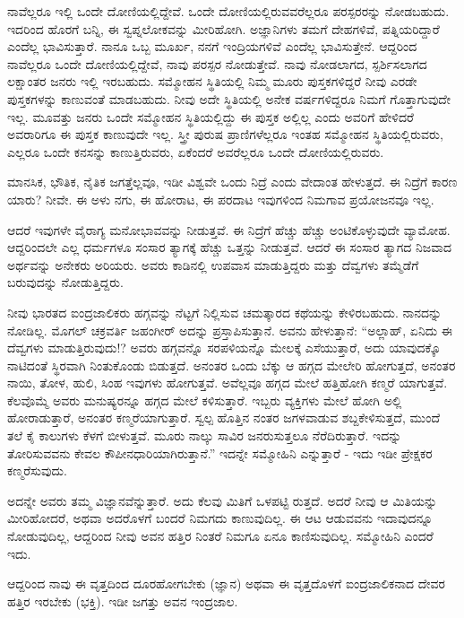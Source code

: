 ನಾವೆಲ್ಲರೂ ಇಲ್ಲಿ ಒಂದೇ ದೋಣಿಯಲ್ಲಿದ್ದೇವೆ. ಒಂದೇ ದೋಣಿಯಲ್ಲಿರುವವರೆಲ್ಲರೂ ಪರಸ್ಪರರನ್ನು ನೋಡಬಹುದು. ಇದರಿಂದ ಹೊರಗೆ ಬನ್ನಿ, ಈ ಸ್ವಪ್ನಲೋಕವನ್ನು ಮೀರಿಹೋಗಿ. ಅಜ್ಞಾನಿಗಳು ತಮಗೆ ದೇಹಗಳಿವೆ, ಪತ್ನಿಯರಿದ್ದಾರೆ ಎಂದೆಲ್ಲ ಭಾವಿಸುತ್ತಾರೆ. ನಾನೂ ಒಬ್ಬ ಮೂರ್ಖ, ನನಗೆ ಇಂದ್ರಿಯಗಳಿವೆ ಎಂದೆಲ್ಲ ಭಾವಿಸುತ್ತೇನೆ. ಆದ್ದರಿಂದ ನಾವೆಲ್ಲರೂ ಒಂದೇ ದೋಣಿಯಲ್ಲಿದ್ದೇವೆ, ನಾವು ಪರಸ್ಪರ ನೋಡುತ್ತೇವೆ. ನಾವು ನೋಡಲಾಗದ, ಸ್ಪರ್ಶಿಸಲಾಗದ ಲಕ್ಷಾಂತರ ಜನರು ಇಲ್ಲಿ ಇರಬಹುದು. ಸಮ್ಮೋಹನ ಸ್ಥಿತಿಯಲ್ಲಿ ನಿಮ್ಮ ಮೂರು ಪುಸ್ತಕಗಳಿದ್ದರೆ ನೀವು ಎರಡೇ ಪುಸ್ತಕಗಳನ್ನು ಕಾಣುವಂತೆ ಮಾಡಬಹುದು. ನೀವು ಅದೇ ಸ್ಥಿತಿಯಲ್ಲಿ ಅನೇಕ ವರ್ಷಗಳಿದ್ದರೂ ನಿಮಗೆ ಗೊತ್ತಾಗುವುದೇ ಇಲ್ಲ. ಮೂವತ್ತು ಜನರು ಒಂದೇ ಸಮ್ಮೋಹನ ಸ್ಥಿತಿಯಲ್ಲಿದ್ದು ಈ ಪುಸ್ತಕ ಅಲ್ಲಿಲ್ಲ ಎಂದು ಅವರಿಗೆ ಹೇಳಿದರೆ ಅವರಾರಿಗೂ ಈ ಪುಸ್ತಕ ಕಾಣುವುದೇ ಇಲ್ಲ. ಸ್ತ್ರೀ ಪುರುಷ ಪ್ರಾಣಿಗಳೆಲ್ಲರೂ ಇಂತಹ ಸಮ್ಮೋಹನ ಸ್ಥಿತಿಯಲ್ಲಿರುವರು, ಎಲ್ಲರೂ ಒಂದೇ ಕನಸನ್ನು ಕಾಣುತ್ತಿರುವರು, ಏಕೆಂದರೆ ಅವರೆಲ್ಲರೂ ಒಂದೇ ದೋಣಿಯಲ್ಲಿರುವರು.

ಮಾನಸಿಕ, ಭೌತಿಕ, ನೈತಿಕ ಜಗತ್ತೆಲ್ಲವೂ, ಇಡೀ ವಿಶ್ವವೇ ಒಂದು ನಿದ್ರೆ ಎಂದು ವೇದಾಂತ ಹೇಳುತ್ತದೆ. ಈ ನಿದ್ರೆಗೆ ಕಾರಣ ಯಾರು? ನೀವೇ. ಈ ಅಳು ನಗು, ಈ ಹೋರಾಟ, ಈ ಪರದಾಟ ಇವುಗಳಿಂದ ನಿಮಗಾವ ಪ್ರಯೋಜನವೂ ಇಲ್ಲ.

ಆದರೆ ಇವುಗಳೇ ವೈರಾಗ್ಯ ಮನೋಭಾವವನ್ನು ನೀಡುತ್ತವೆ. ಈ ನಿದ್ರೆಗೆ ಹೆಚ್ಚು ಹೆಚ್ಚು ಅಂಟಿಕೊಳ್ಳುವುದೇ ವ್ಯಾಮೋಹ. ಆದ್ದರಿಂದಲೇ ಎಲ್ಲ ಧರ್ಮಗಳೂ ಸಂಸಾರ ತ್ಯಾಗಕ್ಕೆ ಹೆಚ್ಚು ಒತ್ತನ್ನು ನೀಡುತ್ತವೆ. ಆದರೆ ಈ ಸಂಸಾರ ತ್ಯಾಗದ ನಿಜವಾದ ಅರ್ಥವನ್ನು ಅನೇಕರು ಅರಿಯರು. ಅವರು ಕಾಡಿನಲ್ಲಿ ಉಪವಾಸ ಮಾಡುತ್ತಿದ್ದರು ಮತ್ತು ದೆವ್ವಗಳು ತಮ್ಮೆಡೆಗೆ ಬರುವುದನ್ನು ನೋಡುತ್ತಿದ್ದರು.

ನೀವು ಭಾರತದ ಐಂದ್ರಜಾಲಿಕರು ಹಗ್ಗವನ್ನು ನೆಟ್ಟಗೆ ನಿಲ್ಲಿಸುವ ಚಮತ್ಕಾರದ ಕಥೆಯನ್ನು ಕೇಳಿರಬಹುದು. ನಾನದನ್ನು ನೋಡಿಲ್ಲ. ಮೊಗಲ್ ಚಕ್ರವರ್ತಿ ಜಹಂಗೀರ್ ಅದನ್ನು ಪ್ರಸ್ತಾಪಿಸುತ್ತಾನೆ. ಅವನು ಹೇಳುತ್ತಾನೆ: “ಅಲ್ಲಾಹ್, ಏನಿದು ಈ ದೆವ್ವಗಳು ಮಾಡುತ್ತಿರುವುದು!? ಅವರು ಹಗ್ಗವನ್ನೊ ಸರಪಳಿಯನ್ನೊ ಮೇಲಕ್ಕೆ ಎಸೆಯುತ್ತಾರೆ, ಅದು ಯಾವುದಕ್ಕೊ ನಾಟಿದಂತೆ ಸ್ಥಿರವಾಗಿ ನಿಂತುಕೊಂಡು ಬಿಡುತ್ತದೆ. ಅನಂತರ ಒಂದು ಬೆಕ್ಕು ಆ ಹಗ್ಗದ ಮೇಲೇರಿ ಹೋಗುತ್ತದೆ, ಅನಂತರ ನಾಯಿ, ತೋಳ, ಹುಲಿ, ಸಿಂಹ ಇವುಗಳು ಹೋಗುತ್ತವೆ. ಅವೆಲ್ಲವೂ ಹಗ್ಗದ ಮೇಲೆ ಹತ್ತಿಹೋಗಿ ಕಣ್ಮರೆ ಯಾಗುತ್ತವೆ. ಕೆಲವೊಮ್ಮೆ ಅವರು ಮನುಷ್ಯರನ್ನೂ ಹಗ್ಗದ ಮೇಲೆ ಕಳಿಸುತ್ತಾರೆ. ಇಬ್ಬರು ವ್ಯಕ್ತಿಗಳು ಮೇಲೆ ಹೋಗಿ ಅಲ್ಲಿ ಹೋರಾಡುತ್ತಾರೆ, ಅನಂತರ ಕಣ್ಮರೆಯಾಗುತ್ತಾರೆ. ಸ್ವಲ್ಪ ಹೊತ್ತಿನ ನಂತರ ಜಗಳವಾಡುವ ಶಬ್ದಕೇಳಿಸುತ್ತದೆ, ಮುಂದೆ ತಲೆ ಕೈ ಕಾಲುಗಳು ಕೆಳಗೆ ಬೀಳುತ್ತವೆ. ಮೂರು ನಾಲ್ಕು ಸಾವಿರ ಜನರುಸುತ್ತಲೂ ನೆರೆದಿರುತ್ತಾರೆ. ಇದನ್ನು ತೋರಿಸುವವನು ಕೇವಲ ಕೌಪೀನಧಾರಿಯಾಗಿರುತ್ತಾನೆ.” ಇದನ್ನೇ ಸಮ್ಮೋಹಿನಿ ಎನ್ನುತ್ತಾರೆ - ಇದು ಇಡೀ ಪ್ರೇಕ್ಷಕರ ಕಣ್ಮರೆಸುವುದು.

ಅದನ್ನೇ ಅವರು ತಮ್ಮ ವಿಜ್ಞಾನವೆನ್ನುತ್ತಾರೆ. ಅದು ಕೆಲವು ಮಿತಿಗೆ ಒಳಪಟ್ಟಿ ರುತ್ತದೆ. ಅದರೆ ನೀವು ಆ ಮಿತಿಯನ್ನು ಮೀರಿಹೋದರೆ, ಅಥವಾ ಅದರೊಳಗೆ ಬಂದರೆ ನಿಮಗದು ಕಾಣುವುದಿಲ್ಲ. ಈ ಆಟ ಆಡುವವನು ಇದಾವುದನ್ನೂ ನೋಡುವುದಿಲ್ಲ, ಆದ್ದರಿಂದ ನೀವು ಅವನ ಹತ್ತಿರ ನಿಂತರೆ ನಿಮಗೂ ಏನೂ ಕಾಣಿಸುವುದಿಲ್ಲ. ಸಮ್ಮೋಹಿನಿ ಎಂದರೆ ಇದು.

ಆದ್ದರಿಂದ ನಾವು ಈ ವೃತ್ತದಿಂದ ದೂರಹೋಗಬೇಕು (ಜ್ಞಾನ) ಅಥವಾ ಈ ವೃತ್ತದೊಳಗೆ ಐಂದ್ರಜಾಲಿಕನಾದ ದೇವರ ಹತ್ತಿರ ಇರಬೇಕು (ಭಕ್ತಿ). ಇಡೀ ಜಗತ್ತು ಅವನ ಇಂದ್ರಜಾಲ.

